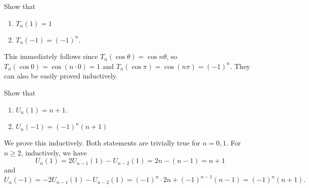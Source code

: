 
	\begin{problem}
		Show that
		\begin{enumerate}[label=(\alph*)]
			\item $T_n(1) = 1$ 
			\item $T_n(-1) = (-1)^n$.
		\end{enumerate}
	\end{problem}
	\begin{solution*}
		This immediately follows since $T_n(\cos\theta) = \cos n\theta$, so $T_n(\cos 0) = \cos (n\cdot 0) = 1$ and $T_n(\cos \pi) = \cos(n\pi) = (-1)^n$. They can also be easily proved inductively.
	\end{solution*}

	\begin{problem}
		Show that
		\begin{enumerate}[label=(\alph*)]
			\item $U_n(1) = n+1$.
			\item $U_n(-1) = (-1)^n (n+1)$
		\end{enumerate}
	\end{problem}
	\begin{solution*}
		We prove this inductively. Both statements are trivially true for $n=0,1$. For $n\ge 2$, inductively, we have
		\[ U_n(1) = 2U_{n-1}(1) - U_{n-2}(1) = 2n - (n-1) = n+1 \]
		and
		\[ U_n(-1) = -2U_{n-1}(1) - U_{n-2}(1) = (-1)^{n} \cdot 2n + (-1)^{n-1} (n-1) = (-1)^n (n+1). \]
	\end{solution*}

